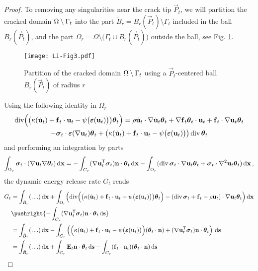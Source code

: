 \begin{proof}
To removing any singularities near the crack tip $\vec{P}_t$, we will partition the cracked domain ${\Omega\setminus\Gamma_t}$ into the part $\tilde{B}_r=B_r(\vec{P}_t)\setminus\Gamma_t$ included in the ball $B_r(\vec{P}_t)$, and the part $\Omega_r=\Omega\setminus\bigl(\Gamma_t\cup B_r(\vec{P}_t)\bigr)$ outside the ball, see Fig. \ref{fig:partition}.
\begin{figure}[htbp]\sidecaption
\centering
\texttt{[image: Li-Fig3.pdf]}
\caption{Partition of the cracked domain ${\Omega\setminus\Gamma_t}$ using a $\vec{P}_t$-centered ball $B_r(\vec{P}_t)$ of radius $r$} \label{fig:partition}
\end{figure}
Using the following identity in $\Omega_r$
\begin{multline} \label{eq:div}
\div\Bigl(\bigl(\kappa(\dot{\vec{u}}_t)+\vec{f}_t\cdot\vec{u}_t-\psi\bigl(\eps(\vec{u}_t)\bigr)\bigr)\vtheta_t\Bigr)=\rho\dot{\vec{u}}_t\cdot\nabla\dot{\vec{u}}_t\vtheta_t+\nabla\vec{f}_t\vtheta_t\cdot\vec{u}_t+\vec{f}_t\cdot\nabla\vec{u}_t\vtheta_t \\
-\sig_t\cdot\eps(\nabla\vec{u}_t)\vtheta_t+\bigl(\kappa(\dot{\vec{u}}_t)+\vec{f}_t\cdot\vec{u}_t-\psi\bigl(\eps(\vec{u}_t)\bigr)\bigr)\div\vtheta_t
\end{multline}
and performing an integration by parts
\begin{equation} \label{eq:signunt}
\int_{\Omega_r}\sig_t\cdot(\nabla\vec{u}_t\nabla\vtheta_t)\dx=-\int_{C_r}(\nabla\vec{u}_t^\mT\sig_t)\vec{n}\cdot\vtheta_t\dx-\int_{\Omega_r}(\div\sig_t\cdot\nabla\vec{u}_t\vtheta_t+\sig_t\cdot\nabla^2\vec{u}_t\vtheta_t)\dx\,,
\end{equation}
the dynamic energy release rate $G_t$ reads
\begin{align*}
G_t &= \int_{\tilde{B}_r}(\ldots)\dx+\int_{\Omega_r}\Bigl(\div\Bigl(\bigl(\kappa(\dot{\vec{u}}_t)+\vec{f}_t\cdot\vec{u}_t-\psi\bigl(\eps(\vec{u}_t)\bigr)\bigr)\vtheta_t\Bigr)-(\div\sig_t+\vec{f}_t-\rho\ddot{\vec{u}}_t)\cdot\nabla\vec{u}_t\vtheta_t\Bigr)\dx \\
&\pushright{-\int_{C_r}(\nabla\vec{u}_t^\mT\sig_t)\vec{n}\cdot\vtheta_t\ds} \\
&= \int_{\tilde{B}_r}(\ldots)\dx-\int_{C_r}\left(\Bigl(\kappa(\dot{\vec{u}}_t)+\vec{f}_t\cdot\vec{u}_t-\psi\bigl(\eps(\vec{u}_t)\bigr)\Bigr)(\vtheta_t\cdot\vec{n})+(\nabla\vec{u}_t^\mT\sig_t)\vec{n}\cdot\vtheta_t\right)\ds \\
&= \int_{\tilde{B}_r}(\ldots)\dx+\int_{C_r}\vec{E}_t\vec{n}\cdot\vtheta_t\ds-\int_{C_r}(\vec{f}_t\cdot\vec{u}_t)(\vtheta_t\cdot\vec{n})\ds

\end{align*}
\end{proof}
